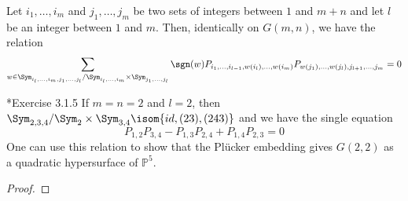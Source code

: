 \documentclass[11pt,leqno,oneside]{amsart}
\numberwithin{thm}{section}
\renewcommand{\P}{\mathbb{P}}
\begin{document}
\begin{thm}
  Let \(i_1, \ldots, i_m\) and \(j_1, \ldots, j_m\) be two sets of
  integers between \(1\) and \(m+n\) and let \(l\) be an integer
  between \(1\) and \(m\). Then, identically on \(G(m,n)\), we have
  the relation \[
    \sum_{w \in
      \Sym_{i_l,\ldots,i_m,j_1,\ldots,j_l}/\Sym_{i_l,\ldots,i_m}
      \times \Sym_{j_1, \ldots, j_l}} \sgn(w) P_{i_1, \ldots,
      i_{l-1},w(i_l), \ldots,w(i_m)} P_{w(j_1),\ldots,w(j_l), j_{l+1},
    \ldots, j_m} = 0
  \]
\end{thm}
\begin{example}
  \cite{manivel}*{Exercise 3.1.5} If \(m=n=2\) and \(l=2\), then
  \(\Sym_{2,3,4}/\Sym_{2} \times 
  \Sym_{3,4} 
  \isom \{id, (23), (243)\}\) and we have the single equation \[
    P_{1,2}P_{3,4} - P_{1,3}P_{2,4} + P_{1,4} P_{2,3} = 0
  \]
  One can use this relation to show that the Pl\"{u}cker embedding
  gives \(G(2,2)\) as a quadratic hypersurface of \(\P^5\).
\end{example}
\begin{proof}
\end{proof}
\end{document}
